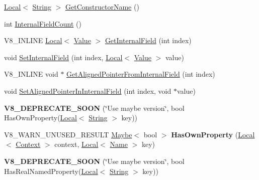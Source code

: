\begin{DoxyCompactItemize}
\item 
\hyperlink{classv8_1_1Local}{Local}$<$ \hyperlink{classv8_1_1String}{String} $>$ \hyperlink{classv8_1_1Object_a7bbe987794658f20a3ec1b68326305e6}{Get\+Constructor\+Name} ()
\item 
int \hyperlink{classv8_1_1Object_aaec28576353eebe6fee113bce2718ecc}{Internal\+Field\+Count} ()
\item 
V8\+\_\+\+I\+N\+L\+I\+N\+E \hyperlink{classv8_1_1Local}{Local}$<$ \hyperlink{classv8_1_1Value}{Value} $>$ \hyperlink{classv8_1_1Object_aa3324fdf652d8ac3b2f27faa0559231d}{Get\+Internal\+Field} (int index)
\item 
void \hyperlink{classv8_1_1Object_aebf949a0592cebc144bb2f96bfb7ec72}{Set\+Internal\+Field} (int index, \hyperlink{classv8_1_1Local}{Local}$<$ \hyperlink{classv8_1_1Value}{Value} $>$ value)
\item 
V8\+\_\+\+I\+N\+L\+I\+N\+E void $\ast$ \hyperlink{classv8_1_1Object_a435f68bb7ef0f64dd522c5c910682448}{Get\+Aligned\+Pointer\+From\+Internal\+Field} (int index)
\item 
void \hyperlink{classv8_1_1Object_a0ccba69581f0b5e4e672bab90f26879b}{Set\+Aligned\+Pointer\+In\+Internal\+Field} (int index, void $\ast$value)
\item 
\hypertarget{classv8_1_1Object_a791276cdeb1a7e6038878dba4cf5fee9}{}{\bfseries V8\+\_\+\+D\+E\+P\+R\+E\+C\+A\+T\+E\+\_\+\+S\+O\+O\+N} (\char`\"{}Use maybe version\char`\"{}, bool Has\+Own\+Property(\hyperlink{classv8_1_1Local}{Local}$<$ \hyperlink{classv8_1_1String}{String} $>$ key))\label{classv8_1_1Object_a791276cdeb1a7e6038878dba4cf5fee9}

\item 
\hypertarget{classv8_1_1Object_acdd3921e95d5bb1a27cea489792607ff}{}V8\+\_\+\+W\+A\+R\+N\+\_\+\+U\+N\+U\+S\+E\+D\+\_\+\+R\+E\+S\+U\+L\+T \hyperlink{classv8_1_1Maybe}{Maybe}$<$ bool $>$ {\bfseries Has\+Own\+Property} (\hyperlink{classv8_1_1Local}{Local}$<$ \hyperlink{classv8_1_1Context}{Context} $>$ context, \hyperlink{classv8_1_1Local}{Local}$<$ \hyperlink{classv8_1_1Name}{Name} $>$ key)\label{classv8_1_1Object_acdd3921e95d5bb1a27cea489792607ff}

\item 
\hypertarget{classv8_1_1Object_abf24b52a108c801a74718e1a1e64ba5b}{}{\bfseries V8\+\_\+\+D\+E\+P\+R\+E\+C\+A\+T\+E\+\_\+\+S\+O\+O\+N} (\char`\"{}Use maybe version\char`\"{}, bool Has\+Real\+Named\+Property(\hyperlink{classv8_1_1Local}{Local}$<$ \hyperlink{classv8_1_1String}{String} $>$ key))\label{classv8_1_1Object_abf24b52a108c801a74718e1a1e64ba5b}


\end{DoxyCompactItemize}
